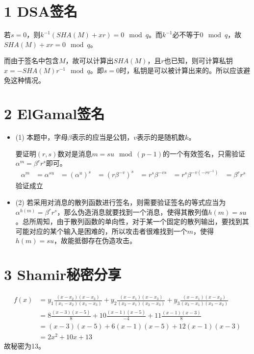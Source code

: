 \documentclass{article}
\date{\today}
\begin{document}
\makecover
\section*{1 DSA签名}
若$s=0$，则$k^{-1}(SHA(M)+xr) = 0 \mod q$。而$k^{-1}$必不等于$0 \mod q$，故$SHA(M)+xr = 0 \mod q$。

而由于签名中包含$M$，故可以计算出$SHA(M)$，且$r$也已知，则可计算私钥$x = -SHA(M)r^{-1} \mod q$。即$s=0$时，私钥是可以被计算出来的。所以应该避免这种情况。

\section*{2 ElGamal签名}
\begin{itemize}
	\item[] (1)
		本题中，字母$\beta$表示的应当是公钥，$v$表示的是随机数$k$。

		要证明$(r,s)$数对是消息$m=su \mod (p-1)$的一个有效签名，只需验证$\alpha^m=\beta^rr^s$即可。
		$$
		\begin{aligned}
		\alpha^m&=\alpha^{su} 
		&=(\alpha^u)^s
		&=(r\beta^{-v})^s
		&=r^s \beta^{-vs}
		&=r^s \beta^{-v(-rv^{-1})}
		&=\beta^{r}r^s
		\end{aligned}
		$$
		验证成立
	\item[] (2)
		若采用对消息的散列函数进行签名，则需要验证签名的等式应当为$\alpha^{h(m)}=\beta^rr^s$，那么伪造消息就要找到一个消息，使得其散列值$h(m)=su$。总所周知，由于散列函数的单向性，对于某一个固定的散列输出，要找到其可能对应的某个输入是困难的，所以攻击者很难找到一个$m$，使得$h(m)=su$，故能抵御存在伪造攻击。
\end{itemize}

\section*{3 Shamir秘密分享}
$$
\begin{aligned}
f(x)&=y_1\frac{(x-x_2)(x-x_3)}{(x_1-x_2)(x_1-x_3)} + y_2\frac{(x-x_1)(x-x_3)}{(x_2-x_1)(x_2-x_3)} + y_3\frac{(x-x_1)(x-x_2)}{(x_3-x_1)(x_3-x_2)}\\
&=8\frac{(x-3)(x-5)}{8} + 10\frac{(x-1)(x-5)}{-4} + 11\frac{(x-1)(x-3)}{8}\\
&=(x-3)(x-5)+6(x-1)(x-5)+12(x-1)(x-3)\\
&=2x^2+10x+13
\end{aligned}
$$
故秘密为13。
\end{document}
